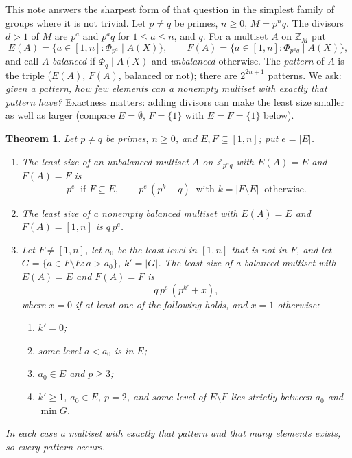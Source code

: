 \documentclass[11pt,a4paper]{amsart}
\newtheorem{theorem}{Theorem}
\theoremstyle{definition}
\theoremstyle{remark}
\newcommand{\Z}{\mathbb{Z}}
\begin{document}
This note answers the sharpest form of that question in the simplest family of groups where it is not
trivial. Let $p\ne q$ be primes, $n\ge 0$, $M=p^nq$. The divisors $d>1$ of $M$ are $p^a$ and $p^aq$ for
$1\le a\le n$, and $q$. For a multiset $A$ on $\Z_M$ put
\[ E(A)=\{a\in[1,n]:\Phi_{p^a}\mid A(X)\},\qquad F(A)=\{a\in[1,n]:\Phi_{p^aq}\mid A(X)\}, \]
and call $A$ \emph{balanced} if $\Phi_q\mid A(X)$ and \emph{unbalanced} otherwise. The \emph{pattern} of $A$
is the triple ($E(A)$, $F(A)$, balanced or not); there are $2^{2n+1}$ patterns. We ask: \emph{given a pattern,
how few elements can a nonempty multiset with exactly that pattern have?} Exactness matters: adding divisors
can make the least size smaller as well as larger (compare $E=\emptyset$, $F=\{1\}$ with $E=F=\{1\}$ below).

\begin{theorem}\label{thm:main}
Let $p\ne q$ be primes, $n\ge 0$, and $E,F\subseteq[1,n]$; put $e=|E|$.
\begin{enumerate}
\item[(a)] The least size of an unbalanced multiset $A$ on $\Z_{p^nq}$ with $E(A)=E$ and $F(A)=F$ is
\[ p^{e}\ \text{ if } F\subseteq E,\qquad p^{e}\,(p^{k}+q)\ \text{ with } k=|F\setminus E|\ \text{ otherwise.} \]
\item[(b)] The least size of a nonempty balanced multiset with $E(A)=E$ and $F(A)=[1,n]$ is $q\,p^{e}$.
\item[(c)] Let $F\ne[1,n]$, let $a_0$ be the least level in $[1,n]$ that is not in $F$, and let
$G=\{a\in F\setminus E:a>a_0\}$, $k'=|G|$. The least size of a balanced multiset with $E(A)=E$ and
$F(A)=F$ is \[ q\,p^{e}\,(p^{k'}+x), \] where $x=0$ if at least one of the following holds, and $x=1$
otherwise:
 \begin{enumerate}
 \item[(1)] $k'=0$;
 \item[(2)] some level $a<a_0$ is in $E$;
 \item[(3)] $a_0\in E$ and $p\ge 3$;
 \item[(4)] $k'\ge1$, $a_0\in E$, $p=2$, and some level of $E\setminus F$ lies strictly between $a_0$ and $\min G$.
 \end{enumerate}
\end{enumerate}
In each case a multiset with exactly that pattern and that many elements exists, so every pattern occurs.
\end{theorem}
\end{document}
